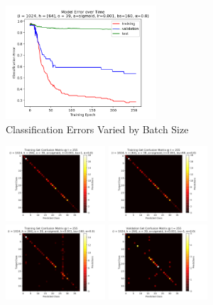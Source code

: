 \documentclass[10pt,epsf]{article}
\begin{document}
{{\begin{figure}[H]
      \includegraphics[width=0.5\textwidth]{./img/64-0.001-160-0-sigmoid-1/error-255.png}
      \caption{Classification Errors Varied by Batch Size}
      \label{fig:error-by-b}
    \end{figure}
    \begin{figure}[H]
      \includegraphics[width=0.33\textwidth]{./img/64-0.001-1-0-sigmoid-1/confusion-matrix-training-255.png}
      \includegraphics[width=0.33\textwidth]{./img/64-0.001-80-0-sigmoid-1/confusion-matrix-training-255.png}
      \includegraphics[width=0.33\textwidth]{./img/64-0.001-160-0-sigmoid-1/confusion-matrix-training-255.png}
      \includegraphics[width=0.33\textwidth]{./img/64-0.001-1-0-sigmoid-1/confusion-matrix-validation-255.png}

\end{figure}}}
\end{document}

